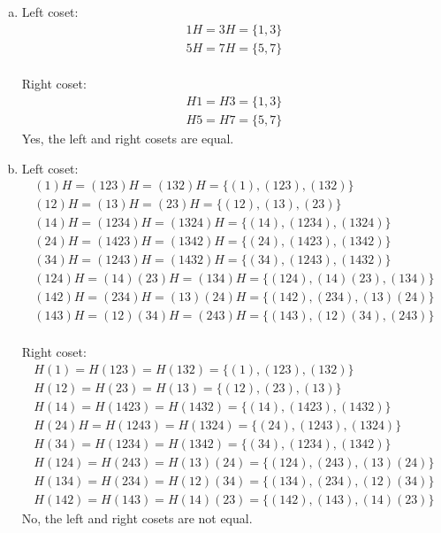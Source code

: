 \begin{enumerate}[(a)]


\item
Left coset:
\begin{gather*}
1H = 3H = \{1, 3\}
\\
5H = 7H = \{5, 7\} 
\end{gather*}
\\
Right coset:
\begin{gather*}
H1 = H3 = \{1, 3\}
\\
H5 = H7 = \{5, 7\} 
\end{gather*}
Yes, the left and right cosets are equal.


\item
Left coset:
\begin{gather*}
(1)H = (123)H = (132)H = \{(1), (123), (132)\}
\\
(12)H =(13)H = (23)H = \{(12), (13), (23)\} 
\\
(14)H =(1234)H = (1324)H = \{(14), (1234), (1324)\} 
\\
(24)H =(1423)H = (1342)H = \{(24), (1423), (1342)\}
\\
(34)H =(1243)H = (1432)H = \{(34), (1243), (1432)\}
\\
(124)H =(14)(23)H = (134)H = \{(124), (14)(23), (134)\}
\\
(142)H =(234)H = (13)(24)H = \{(142), (234), (13)(24)\}
\\
(143)H =(12)(34)H = (243)H = \{(143), (12)(34), (243)\}
\end{gather*}
\\
Right coset:
\begin{gather*}
H(1) = H(123) = H(132) = \{(1), (123), (132)\}
\\
H(12) = H(23) = H(13) = \{(12), (23), (13)\} 
\\
H(14) = H(1423) = H(1432)  = \{(14), (1423), (1432)\} 
\\
H(24)H = H(1243) = H(1324)  = \{(24), (1243), (1324)\}
\\
H(34) = H(1234) = H(1342) = \{(34), (1234), (1342)\}
\\
H(124) = H(243) = H(13)(24) = \{(124), (243), (13)(24)\}
\\
H(134) = H(234) = H(12)(34) =  \{(134), (234), (12)(34)\}
\\
H(142) = H(143) = H(14)(23) =  \{(142), (143), (14)(23)\}
\end{gather*}
No, the left and right cosets are not equal.


\end{enumerate}

